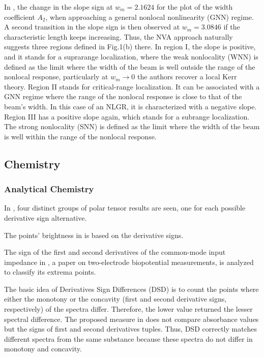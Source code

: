\documentclass[11pt]{book}
\begin{document}
In \cite{duque2019generation}, the change in the slope sign at $w_{m}=2.1624$
for the plot of the width coefficient $A_{2}$, when approaching a
general nonlocal nonlinearity (GNN) regime. A second transition in
the slope sign is then observed at $w_{m}=3.0846$ if the characteristic
length keeps increasing. Thus, the NVA approach naturally suggests
three regions defined in Fig.1(b) there. In region I, the slope is
positive, and it stands for a suprarange localization, where the weak
nonlocality (WNN) is defined as the limit where the width of the beam
is well outside the range of the nonlocal response, particularly at
$w_{m}\rightarrow0$ the authors recover a local Kerr theory. Region
II stands for critical-range localization. It can be associated with
a GNN regime where the range of the nonlocal response is close to
that of the beam's width. In this case of an NLGR, it is characterized
with a negative slope. Region III has a positive slope again, which
stands for a subrange localization. The strong nonlocality (SNN) is
defined as the limit where the width of the beam is well within the
range of the nonlocal response.


\subsection{Chemistry}


\subsubsection{Analytical Chemistry}

In \cite{de2000infrared},
four distinct groups of polar tensor results are seen, one for each
possible derivative sign alternative.

The points' brightness in \cite{el2002multiple} is based on the derivative
signs.

The sign of the first and second derivatives of the common-mode input
impedance in \cite{spinelli2005two}, a paper on two-electrode biopotential measurements, is analyzed to classify its extrema
points.

The basic idea of Derivatives Sign Differences (DSD) is to count the
points where either the monotony or the concavity (first and second
derivative signs, respectively) of the spectra differ. Therefore,
the lower value returned the lesser spectral difference. The proposed
measure in \cite{gutierrez2010new} does not compare absorbance values
but the signs of first and second derivatives tuples. Thus, DSD correctly
matches different spectra from the same substance because these spectra
do not differ in monotony and concavity.
\end{document}
